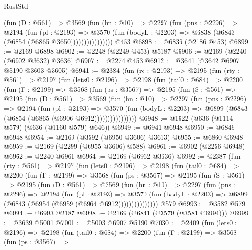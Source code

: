 \begin{lexlean}{RustStd}
\begin{coremodule}
{\begin{coremodule}
{{{{{{{{{{{{{{{                    (fun (D : @561) =>
                    @3569
                      (fun (hn : @10) =>
                      @2297
                        (fun (pns : @2296) =>
                        @2194
                          (fun (pl : @2193) =>
                          @3570
                            (fun (bodyL : @2203) => @6838 (@6843 (@6854 (@6865 @3650))))))))))))))))
    @453
@6898 := @6836 (@2186 @453)
@6899 := @2169 @6898
@6902 := @2248 (@2249 @453) @5187
@6906 := @2169 (@2240 (@6902 @3632) @3636)
@6907 := @2274 @453
@6912 := @3641 (@3642 @6907 @5190 @3603 @3605)
@6941 := @2384
    (fun (rc : @2193) =>
    @2195
      (fun (rty : @561) =>
      @2197
        (fun (lets0 : @2196) =>
        @2198
          (fun (tail0 : @684) =>
          @2200
            (fun (Γ : @2199) =>
            @3568
              (fun (ps : @3567) =>
              @2195
                (fun (S : @561) =>
                @2195
                  (fun (D : @561) =>
                  @3569
                    (fun (hn : @10) =>
                    @2297
                      (fun (pns : @2296) =>
                      @2194
                        (fun (pl : @2193) =>
                        @3570
                          (fun (bodyL : @2203) =>
                          @6899 (@6843 (@6854 (@6865 (@6906 @6912))))))))))))))))
@6948 := @1622 (@636 (@1114 @579) (@636 (@1160 @579) @646))
@6949 := @6941 @6948
@6950 := @6849 @6948
@6954 := @2169 (@3592 (@6950 @3606) @3613)
@6955 := @6860 @6948
@6959 := @2169 (@2299 (@6955 @3606) @588)
@6961 := @6902 (@2256 @6948)
@6962 := @2240 @6961
@6964 := @2169 (@6962 @3636)
@6992 := @2387
    (fun (rty : @561) =>
    @2197
      (fun (lets0 : @2196) =>
      @2198
        (fun (tail0 : @684) =>
        @2200
          (fun (Γ : @2199) =>
          @3568
            (fun (ps : @3567) =>
            @2195
              (fun (S : @561) =>
              @2195
                (fun (D : @561) =>
                @3569
                  (fun (hn : @10) =>
                  @2297
                    (fun (pns : @2296) =>
                    @2194
                      (fun (pl : @2193) =>
                      @3570
                        (fun (bodyL : @2203) =>
                        @6899 (@6843 (@6954 (@6959 (@6964 @6912)))))))))))))))
    @579
@6993 := @3582 @579
@6994 := @6993 @2187
@6998 := @2169 (@6841 (@3579 (@3581 @6994)))
@6999 := @3639 @5001
@7001 := @5003 @6907 @5190
@7030 := @2409
    (fun (lets0 : @2196) =>
    @2198
      (fun (tail0 : @684) =>
      @2200
        (fun (Γ : @2199) =>
        @3568
          (fun (ps : @3567) =>
}}}}}}}}}}}}}}}
\end{coremodule}}
\end{coremodule}
\end{lexlean}
